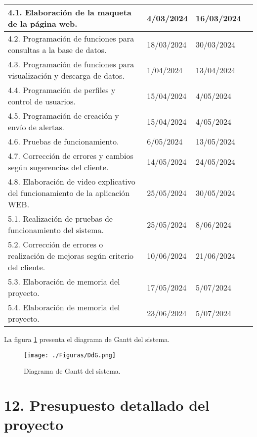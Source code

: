 \documentclass[
11pt, %
codirector, %
]{charter}
\begin{document}
\begin{table}[ht]
\begin{tabularx}{\linewidth}{@{}|l|X|X|l|@{}}
4.1. Elaboración de la maqueta de la página web. & 4/03/2024 & 16/03/2024 \\ \hline
4.2. Programación de funciones para consultas a la base de datos. & 18/03/2024 & 30/03/2024 \\ \hline
4.3. Programación de funciones para visualización y descarga de datos. & 1/04/2024 & 13/04/2024 \\ \hline
4.4. Programación de perfiles y control de usuarios. & 15/04/2024 & 4/05/2024 \\ \hline
4.5. Programación de creación y envío de alertas. & 15/04/2024 & 4/05/2024 \\ \hline
4.6. Pruebas de funcionamiento. & 6/05/2024 & 13/05/2024 \\ \hline
4.7. Corrección de errores y cambios según sugerencias del cliente. & 14/05/2024 & 24/05/2024 \\ \hline
4.8. Elaboración de video explicativo del funcionamiento de la aplicación WEB. & 25/05/2024 & 30/05/2024 \\ \hline
5.1. Realización de pruebas de funcionamiento del sistema. & 25/05/2024 & 8/06/2024 \\ \hline
5.2. Corrección de errores o realización de mejoras según criterio del cliente. & 10/06/2024 & 21/06/2024 \\ \hline
5.3. Elaboración de memoria del proyecto. & 17/05/2024 & 5/07/2024 \\ \hline
5.4. Elaboración de memoria del proyecto. & 23/06/2024 & 5/07/2024 \\ \hline

\end{tabularx}
\end{table}





La figura  \ref{fig:DdG} presenta el diagrama de Gantt del sistema. 
\begin{figure}[htpb]
\centering 
\texttt{[image: ./Figuras/DdG.png]}
\caption{Diagrama de Gantt del sistema.}
\label{fig:DdG}
\end{figure}








\section{12. Presupuesto detallado del proyecto}
\label{sec:presupuesto}
\end{document}
